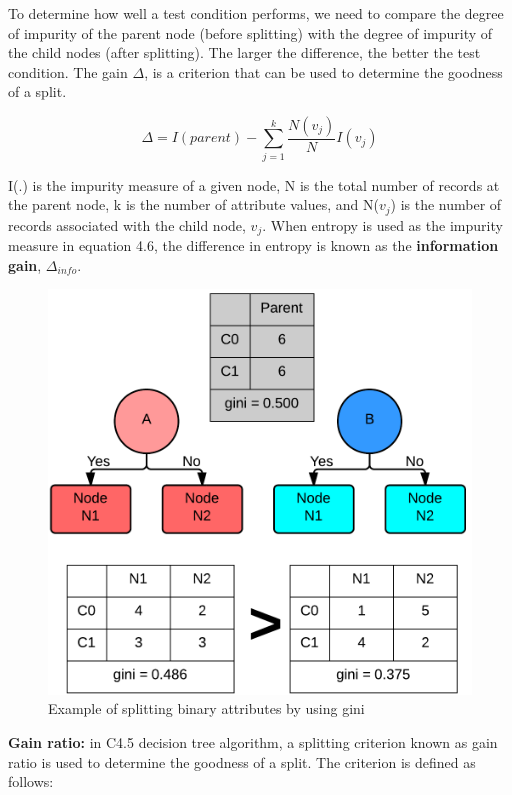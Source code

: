 		To determine how well a test condition performs, we need to compare the 
		degree of impurity of the parent node (before splitting) with the degree
		of impurity of the child nodes (after splitting). The larger the difference,
		the better the test condition. The gain $\Delta$, is a criterion that can 
		be used to determine the goodness of a split. 

			\begin{equation}
				\Delta = I(parent) - \sum_{j=1}^{k} \frac{N(v_{j})}{N}I(v_{j})
			\end{equation}

		I(.) is the impurity measure of a given node, N is the total number
		of records at the parent node, k is the number of attribute values, 
		and N($v_{j}$) is the number of records associated with the child node, $v_{j}$.
		When entropy is used as the impurity measure in equation 4.6, the difference
		in entropy is known as the {\bf information gain}, $\Delta_{info}$.

		\begin{figure}[H]
			\centering
			\includegraphics[scale=0.25]{pics/gini.png}
			\caption{Example of splitting binary attributes by using gini}
		\end{figure}

		{\bf Gain ratio:} in C4.5 decision tree algorithm, a splitting criterion known
		as gain ratio is used to determine the goodness of a split. The criterion is
		defined as follows:

